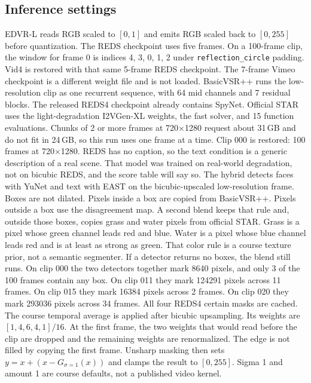 \documentclass[10pt,twocolumn,letterpaper]{article}
\begin{document}
\subsection{Inference settings}
EDVR-L reads RGB scaled to $[0,1]$ and emits RGB scaled back to $[0,255]$ before quantization.
The REDS checkpoint uses five frames.
On a 100-frame clip, the window for frame 0 is indices 4, 3, 0, 1, 2 under \texttt{reflection\_circle} padding.
Vid4 is restored with that same 5-frame REDS checkpoint. The 7-frame Vimeo checkpoint is a different weight file and is not loaded.
BasicVSR++ runs the low-resolution clip as one recurrent sequence, with 64 mid channels and 7 residual blocks.
The released REDS4 checkpoint already contains SpyNet.
Official STAR uses the light-degradation I2VGen-XL weights, the fast solver, and 15 function evaluations.
Chunks of 2 or more frames at 720$\times$1280 request about 31\,GB and do not fit in 24\,GB, so this run uses one frame at a time.
Clip 000 is restored: 100 frames at 720$\times$1280.
REDS has no caption, so the text condition is a generic description of a real scene.
That model was trained on real-world degradation, not on bicubic REDS, and the score table will say so.
The hybrid detects faces with YuNet and text with EAST on the bicubic-upscaled low-resolution frame.
Boxes are not dilated.
Pixels inside a box are copied from BasicVSR++.
Pixels outside a box use the disagreement map.
A second blend keeps that rule and, outside those boxes, copies grass and water pixels from official STAR.
Grass is a pixel whose green channel leads red and blue.
Water is a pixel whose blue channel leads red and is at least as strong as green.
That color rule is a course texture prior, not a semantic segmenter.
If a detector returns no boxes, the blend still runs.
On clip 000 the two detectors together mark 8640 pixels, and only 3 of the 100 frames contain any box.
On clip 011 they mark 124291 pixels across 11 frames.
On clip 015 they mark 16384 pixels across 2 frames.
On clip 020 they mark 293036 pixels across 34 frames.
All four REDS4 certain masks are cached.
The course temporal average is applied after bicubic upsampling.
Its weights are $[1,4,6,4,1]/16$.
At the first frame, the two weights that would read before the clip are dropped and the remaining weights are renormalized.
The edge is not filled by copying the first frame.
Unsharp masking then sets $y = x + (x - G_{\sigma=1}(x))$ and clamps the result to $[0,255]$.
Sigma 1 and amount 1 are course defaults, not a published video kernel.
\end{document}
